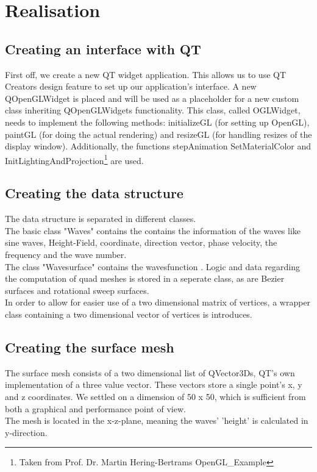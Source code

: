\documentclass[12pt,a4paper]{scrartcl}
\begin{document}
\section{Realisation}

\subsection{Creating an interface with QT}
First off, we create a new QT widget application. This allows us to use QT Creators design feature to set up our application's interface. A new QOpenGLWidget is placed and will be used as a placeholder for a new custom class inheriting QOpenGLWidgets functionality. This class, called OGLWidget, needs to implement the following methods: initializeGL (for setting up OpenGL), paintGL (for doing the actual rendering) and resizeGL (for handling resizes of the display window). Additionally, the functions stepAnimation SetMaterialColor and InitLightingAndProjection\footnote{Taken from Prof. Dr. Martin Hering-Bertrams OpenGL_Example} are used.

\subsection{Creating the data structure}
The data structure is separated in different classes. \\
The basic class "Waves" contains the contains the information of the waves like sine waves, Height-Field, coordinate, direction vector, phase velocity, the frequency and the wave number.  \\ 
The class "Wavesurface" contains the wavesfunction . 
Logic and data regarding the computation of quad meshes is stored in a seperate class, as are Bezier surfaces and rotational sweep surfaces. \\
In order to allow for easier use of a two dimensional matrix of vertices, a wrapper class containing a two dimensional vector of vertices is introduces. \\


\subsection{Creating the surface mesh}
The surface mesh consists of a two dimensional list of QVector3Ds, QT's own implementation of a three value vector. These vectors store a single point's x, y and z coordinates. We settled on a dimension of 50 x 50, which is sufficient from both a graphical and performance point of view.\\
The mesh is located in the x-z-plane, meaning the waves' 'height' is calculated in y-direction.\\
\end{document}
